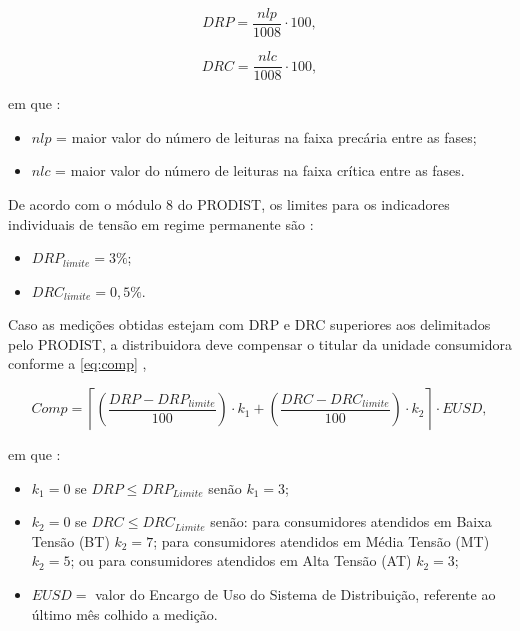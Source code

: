 \begin{equation}
  DRP = \frac{nlp}{1008}\cdot100,
  \label{eq:drp}
\end{equation}

\begin{equation}
  DRC = \frac{nlc}{1008}\cdot100,
  \label{eq:drc}
\end{equation}

\noindent
em que \cite{ref:ANEEL2021}:

\begin{itemize}
  \item $nlp$ = maior valor do número de leituras na faixa precária entre as fases;
  \item $nlc$ = maior valor do número de leituras na faixa crítica entre as fases.
\end{itemize}

De acordo com o módulo 8 do PRODIST, os limites para os indicadores individuais de tensão em regime permanente são \cite{ref:ANEEL2021}:

\begin{itemize}
  \item $DRP_{limite}=3\%$;
  \item $DRC_{limite}=0,5\%$.
\end{itemize}

Caso as medições obtidas estejam com DRP e DRC superiores aos delimitados pelo PRODIST, a distribuidora deve compensar o titular da unidade consumidora conforme a \autoref{eq:comp} \cite{ref:ANEEL2021},

\begin{equation}
  Comp=\left\lceil\left(\frac{DRP - DRP_{limite}}{100}\right) \cdot k_1+\left(\frac{D R C-D R C_{limite}}{100}\right) \cdot k_2\right\rceil \cdot EUSD,
  \label{eq:comp}
\end{equation}

\noindent
em que \cite{ref:ANEEL2021}:

\begin{itemize}
  \item $k_1=0$ se $DRP \leq DRP_{Limite}$ senão $k_1=3$;
  \item $k_2=0$ se $DRC \leq DRC_{Limite}$ senão: para consumidores atendidos em Baixa Tensão (BT) $k_2=7$; para consumidores atendidos em Média Tensão (MT) $k_2=5$; ou para consumidores atendidos em Alta Tensão (AT) $k_2=3$;
  \item $EUSD =$ valor do Encargo de Uso do Sistema de Distribuição, referente ao último mês colhido a medição.
\end{itemize}

